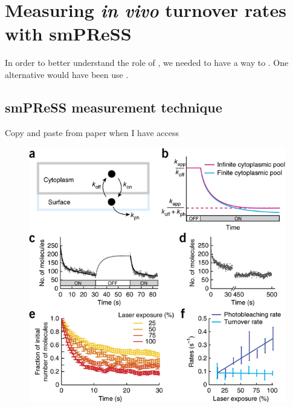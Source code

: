 \section{Measuring \textit{in vivo} turnover rates with smPReSS}

In order to better understand the role of , we needed to have a way to .  One alternative would have been use .  

\subsection{smPReSS measurement technique}

Copy and paste from paper when I have access

\begin{figure}[h!]
\centering
\includegraphics[width=0.8\hsize]{nmeth/nmeth.jpg}

\end{figure}
